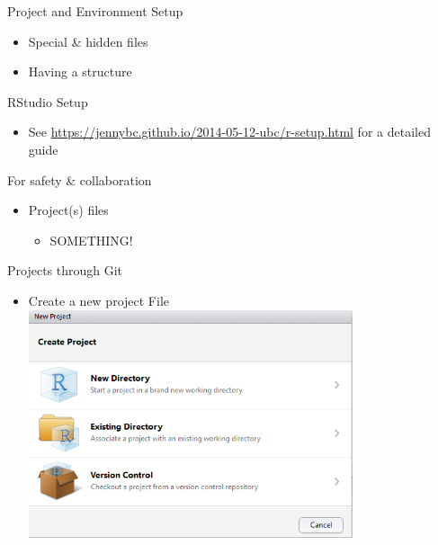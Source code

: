 \documentclass[
  ignorenonframetext,
]{beamer}
\providecommand{\tightlist}{%
  \setlength{\itemsep}{0pt}\setlength{\parskip}{0pt}}
\begin{document}
\begin{frame}{Project and Environment Setup}
\protect\hypertarget{project-and-environment-setup}{}

\begin{itemize}
\tightlist
\item
  Special \& hidden files
\item
  Having a structure
\end{itemize}

\end{frame}

\begin{frame}{RStudio Setup}
\protect\hypertarget{rstudio-setup}{}

\begin{itemize}
\tightlist
\item
  See \url{https://jennybc.github.io/2014-05-12-ubc/r-setup.html} for a
  detailed guide
\end{itemize}

\end{frame}

\begin{frame}{For safety \& collaboration}
\protect\hypertarget{for-safety-collaboration}{}

\begin{itemize}
\tightlist
\item
  Project(s) files

  \begin{itemize}
  \tightlist
  \item
    SOMETHING!
  \end{itemize}
\end{itemize}

\end{frame}

\begin{frame}{Projects through Git}
\protect\hypertarget{projects-through-git}{}

\begin{itemize}
\tightlist
\item
  Create a new project File
  \includegraphics[width=0.75\textwidth,height=\textheight]{../external/images/setup_2_rstudio_project.PNG}
\end{itemize}

\end{frame}
\end{document}
